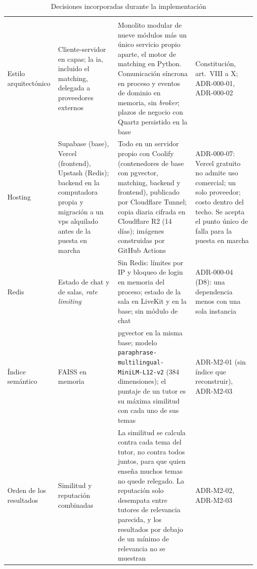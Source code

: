 {\small
\begin{xltabular}{\textwidth}{>{\raggedright\arraybackslash}p{2.6cm} >{\raggedright\arraybackslash}p{3.1cm} L >{\raggedright\arraybackslash}p{2.3cm}}
    \caption{Decisiones incorporadas durante la implementación}
    \label{tab:decisiones-implementacion} \\
    \toprule
     &  &  &  \\
    \midrule
    \endfirsthead
    \toprule
     &  &  &  \\
    \midrule
    \endhead
    \bottomrule
    \endfoot
    Estilo arquitectónico & Cliente-servidor en capas; la \gls{ia}, incluido el \gls{matching}, delegada a proveedores externos & Monolito modular de nueve módulos más un único servicio propio aparte, el motor de \gls{matching} en Python. Comunicación síncrona en proceso y eventos de dominio en memoria, sin \emph{broker}; plazos de negocio con Quartz persistido en la base & Constitución, art.~VIII a X; ADR-000-01, ADR-000-02 \\
    Hosting & Supabase (base), Vercel (frontend), Upstash (Redis); backend en la computadora propia y migración a un \gls{vps} alquilado antes de la puesta en marcha & Todo en un servidor propio con Coolify (contenedores de base con pgvector, \gls{matching}, backend y frontend), publicado por Cloudflare Tunnel; copia diaria cifrada en Cloudflare R2 (14 días); imágenes construidas por GitHub Actions & ADR-000-07: Vercel gratuito no admite uso comercial; un solo proveedor; costo dentro del techo. Se acepta el punto único de falla para la puesta en marcha \\
    Redis & Estado de chat y de salas, \emph{rate limiting} & Sin Redis: límites por IP y bloqueo de login en memoria del proceso; estado de la sala en LiveKit y en la base; sin módulo de chat & ADR-000-04 (D8): una dependencia menos con una sola instancia \\
    Índice semántico & FAISS en memoria & pgvector en la misma base; modelo \texttt{paraphrase-}\allowbreak\texttt{multilingual-}\allowbreak\texttt{MiniLM-L12-v2} (384 dimensiones); el puntaje de un tutor es su máxima similitud con cada uno de sus temas & ADR-M2-01 (sin índice que reconstruir), ADR-M2-03 \\
    Orden de los resultados & Similitud y reputación combinadas & La similitud se calcula contra cada tema del tutor, no contra todos juntos, para que quien enseña muchos temas no quede relegado. La reputación solo desempata entre tutores de relevancia parecida, y los resultados por debajo de un mínimo de relevancia no se muestran & ADR-M2-02, ADR-M2-03 \\

\end{xltabular}}
